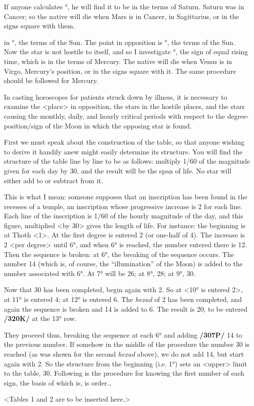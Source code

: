If anyone calculates \Leo\xspace 27°, he will find it to be in the terms of Saturn. Saturn was in Cancer; so the native will die when Mars is in Cancer, in Sagittarius, or in the signs square with them.

\Venus\xspace in \Scorpio\xspace 27°, the terms of the Sun. The point in opposition is \Taurus\xspace 27°, the terms of the Sun. Now the star is not hostile to itself, and so I investigate \Scorpio\xspace 27°, the sign of equal rising time, which is in the terms of Mercury. The native will die when Venus is in Virgo, Mercury’s position, or in the signs square with it. The same procedure should be followed for Mercury.

In casting horoscopes for patients struck down by illness, it is necessary to examine the <place> in opposition, the stars in the hostile places, and the stars causing the monthly, daily, and hourly critical periods with respect to the degree-position/sign of the Moon in which the opposing star is found.

First we must speak about the construction of the table, so that anyone wishing to derive it handily anew might easily determine its structure. You will find the structure of the table line by line to be as follows: multiply 1/60 of the magnitude given for each day by 30, and the result will be the span of life. No star will either add to or subtract from it.

This is what I mean: someone supposes that an inscription has been found in the recesses of a temple, an inscription whose progressive increase is 2 for each line. Each line of the inscription is 1/60 of the hourly magnitude of the day, and this figure, multiplied <by 30>
gives the length of life. For instance: the beginning is at Thoth <1>. At the first degree is entered 2 (or one-half of 4). The increase is 2 <per degree> until 6°, and when 6° is reached, the number entered there is
12. Then the sequence is broken: at 6°, the breaking of the sequence occurs. The number 14 (which is, of course, the “illumination” of the Moon) is added to the number associated with 6°. At 7° will be 26; at
8°, 28; at 9°, 30. 

Now that 30 has been completed, begin again with 2. So at <10° is entered 2>, at 11° is entered 4; at 12° is entered 6. The \textit{hexad} of 2 has been completed, and again the sequence is broken and 14 is added to 6. The result is 20, to be entered \textbf{/320K/} at the 13° row.

They proceed thus, breaking the sequence at each 6° and adding \textbf{/307P/} 14 to the previous number. If somehow in the middle of the procedure the number 30 is reached (as was shown for the second \textit{hexad} above), we do not add 14, but start again with 2. So the structure from the beginning (i.e. 1°) sets an <upper> limit to the table, 30. Following is the procedure for knowing the first number of each sign, the basis of which is, is order…

<Tables 1 and 2 are to be inserted here.>

\newpage